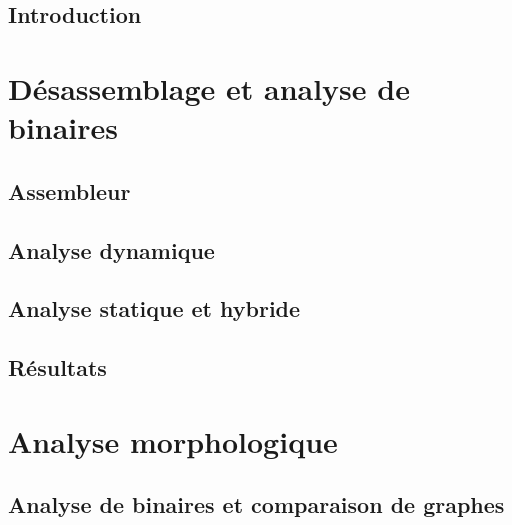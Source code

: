 \documentclass[12pt, oneside]{TUL/thesul}
\begin{document}



\DontWriteThisInToc   
\listoffigures


\mainmatter

\DontFrameThisInToc
\NumberThisInToc
\chapter{Introduction}


\part{Désassemblage et analyse de binaires}

\DontFrameThisInToc
\chapter{Assembleur}


\DontFrameThisInToc
\chapter{Analyse dynamique}


\DontFrameThisInToc
\chapter{Analyse statique et hybride}



\DontFrameThisInToc
\chapter{Résultats}
% 

\part{Analyse morphologique}
\DontFrameThisInToc
\chapter{Analyse de binaires et comparaison de graphes}
\end{document}
